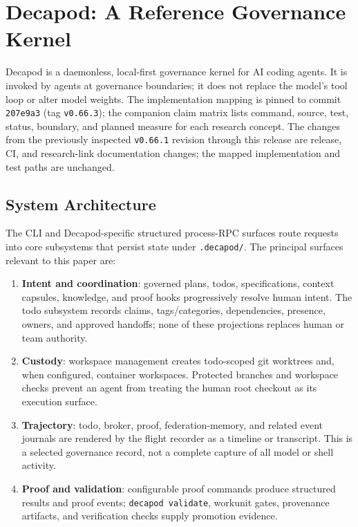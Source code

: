 \section{Decapod: A Reference Governance Kernel}
\label{sec:system}

Decapod is a daemonless, local-first governance kernel for AI coding agents. It is invoked by agents at governance boundaries; it does not replace the model's tool loop or alter model weights. The implementation mapping is pinned to commit \texttt{207e9a3} (tag \texttt{v0.66.3}); the companion claim matrix lists command, source, test, status, boundary, and planned measure for each research concept. The changes from the previously inspected \texttt{v0.66.1} revision through this release are release, CI, and research-link documentation changes; the mapped implementation and test paths are unchanged.

\subsection{System Architecture}
The CLI and Decapod-specific structured process-RPC surfaces route requests into core subsystems that persist state under \texttt{.decapod/}. The principal surfaces relevant to this paper are:
\begin{enumerate}
    \item \textbf{Intent and coordination}: governed plans, todos, specifications, context capsules, knowledge, and proof hooks progressively resolve human intent. The todo subsystem records claims, tags/categories, dependencies, presence, owners, and approved handoffs; none of these projections replaces human or team authority.
    \item \textbf{Custody}: workspace management creates todo-scoped git worktrees and, when configured, container workspaces. Protected branches and workspace checks prevent an agent from treating the human root checkout as its execution surface.
    \item \textbf{Trajectory}: todo, broker, proof, federation-memory, and related event journals are rendered by the flight recorder as a timeline or transcript. This is a selected governance record, not a complete capture of all model or shell activity.
    \item \textbf{Proof and validation}: configurable proof commands produce structured results and proof events; \texttt{decapod validate}, workunit gates, provenance artifacts, and verification checks supply promotion evidence.
\end{enumerate}

